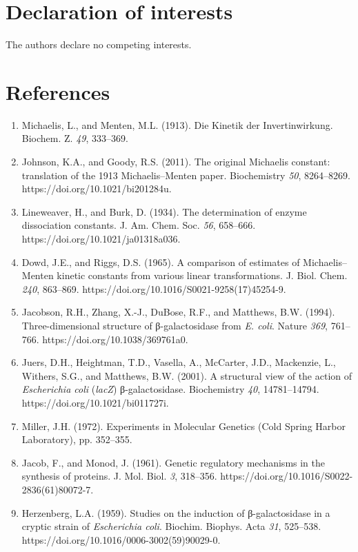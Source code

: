 \documentclass[9pt,twocolumn]{extarticle}
\newcommand{\dash}{–}
\begin{document}
\section{Declaration of interests}
The authors declare no competing interests.

\section{References}
{\footnotesize
\begin{enumerate}[leftmargin=14pt,itemsep=2pt,topsep=0pt,label=\arabic*.]
\item Michaelis, L., and Menten, M.L. (1913). Die Kinetik der Invertinwirkung. Biochem. Z. \textit{49}, 333\dash 369.
\item Johnson, K.A., and Goody, R.S. (2011). The original Michaelis constant: translation of the 1913 Michaelis\dash Menten paper. Biochemistry \textit{50}, 8264\dash 8269. https://doi.org/10.1021/bi201284u.
\item Lineweaver, H., and Burk, D. (1934). The determination of enzyme dissociation constants. J. Am. Chem. Soc. \textit{56}, 658\dash 666. https://doi.org/10.1021/ja01318a036.
\item Dowd, J.E., and Riggs, D.S. (1965). A comparison of estimates of Michaelis\dash Menten kinetic constants from various linear transformations. J. Biol. Chem. \textit{240}, 863\dash 869. https://doi.org/10.1016/S0021-9258(17)45254-9.
\item Jacobson, R.H., Zhang, X.-J., DuBose, R.F., and Matthews, B.W. (1994). Three-dimensional structure of β-galactosidase from \textit{E. coli}. Nature \textit{369}, 761\dash 766. https://doi.org/10.1038/369761a0.
\item Juers, D.H., Heightman, T.D., Vasella, A., McCarter, J.D., Mackenzie, L., Withers, S.G., and Matthews, B.W. (2001). A structural view of the action of \textit{Escherichia coli} (\textit{lacZ}) β-galactosidase. Biochemistry \textit{40}, 14781\dash 14794. https://doi.org/10.1021/bi011727i.
\item Miller, J.H. (1972). Experiments in Molecular Genetics (Cold Spring Harbor Laboratory), pp. 352\dash 355.
\item Jacob, F., and Monod, J. (1961). Genetic regulatory mechanisms in the synthesis of proteins. J. Mol. Biol. \textit{3}, 318\dash 356. https://doi.org/10.1016/S0022-2836(61)80072-7.
\item Herzenberg, L.A. (1959). Studies on the induction of β-galactosidase in a cryptic strain of \textit{Escherichia coli}. Biochim. Biophys. Acta \textit{31}, 525\dash 538. https://doi.org/10.1016/0006-3002(59)90029-0.

\end{enumerate}}
\end{document}
